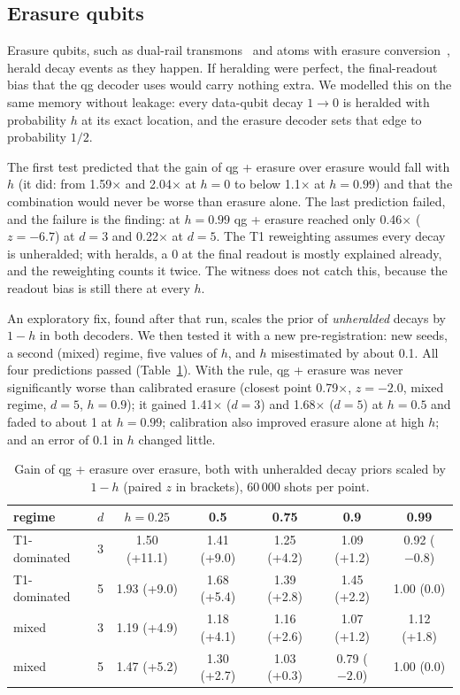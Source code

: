 \documentclass[11pt]{article}
\begin{document}
\subsection{Erasure qubits}\label{sec:erasure}

Erasure qubits, such as dual-rail transmons~\cite{kubica2023erasure} and atoms with erasure
conversion~\cite{wu2022erasure}, herald decay events as they happen. If heralding were perfect, the
final-readout bias that the qg decoder uses would carry nothing extra. We modelled this on the same
memory without leakage: every data-qubit decay $1\to0$ is heralded with probability $h$ at its exact
location, and the erasure decoder sets that edge to probability $1/2$.

The first test predicted that the gain of qg + erasure over erasure would fall with $h$ (it did: from
1.59$\times$ and 2.04$\times$ at $h=0$ to below 1.1$\times$ at $h=0.99$) and that the combination would
never be worse than erasure alone. The last prediction failed, and the failure is the finding: at
$h=0.99$ qg + erasure reached only 0.46$\times$ ($z=-6.7$) at $d=3$ and 0.22$\times$ at $d=5$. The
T1 reweighting assumes every decay is unheralded; with heralds, a 0 at the final readout is mostly
explained already, and the reweighting counts it twice. The witness does not catch this, because the
readout bias is still there at every $h$.

An exploratory fix, found after that run, scales the prior of \emph{unheralded} decays by $1-h$ in
both decoders. We then tested it with a new pre-registration: new seeds, a second (mixed) regime,
five values of $h$, and $h$ misestimated by about 0.1. All four predictions passed
(Table~\ref{tab:erasure}). With the rule, qg + erasure was never significantly worse than calibrated
erasure (closest point 0.79$\times$, $z=-2.0$, mixed regime, $d=5$, $h=0.9$); it gained 1.41$\times$
($d=3$) and 1.68$\times$ ($d=5$) at $h=0.5$ and faded to about 1 at $h=0.99$; calibration also improved
erasure alone at high $h$; and an error of 0.1 in $h$ changed little.

\begin{table}[t]
\centering\small
\caption{Gain of qg + erasure over erasure, both with unheralded decay priors scaled by $1-h$
(paired $z$ in brackets), 60\,000 shots per point.}
\label{tab:erasure}
\setlength{\tabcolsep}{4pt}
\begin{tabular}{lcccccc}
\toprule
regime & $d$ & $h=0.25$ & 0.5 & 0.75 & 0.9 & 0.99\\
\midrule
T1-dominated & 3 & 1.50 (+11.1) & 1.41 (+9.0) & 1.25 (+4.2) & 1.09 (+1.2) & 0.92 ($-0.8$)\\
T1-dominated & 5 & 1.93 (+9.0) & 1.68 (+5.4) & 1.39 (+2.8) & 1.45 (+2.2) & 1.00 (0.0)\\
mixed & 3 & 1.19 (+4.9) & 1.18 (+4.1) & 1.16 (+2.6) & 1.07 (+1.2) & 1.12 (+1.8)\\
mixed & 5 & 1.47 (+5.2) & 1.30 (+2.7) & 1.03 (+0.3) & 0.79 ($-2.0$) & 1.00 (0.0)\\
\bottomrule
\end{tabular}
\end{table}
\end{document}
